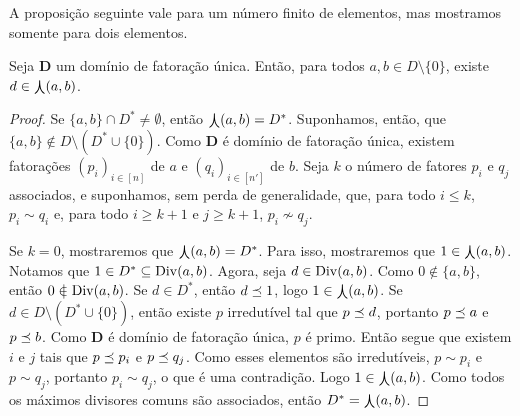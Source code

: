A proposição seguinte vale para um número finito de elementos, mas mostramos somente para dois elementos.

\begin{proposition}
Seja $\bm D$ um domínio de fatoração única. Então, para todos $a,b \in D \setminus \{0\}$, existe $d \in \mathop{\bigcurlywedge}(a,b)$.
\end{proposition}
\begin{proof}
Se $\{a,b\} \cap D^* \neq \emptyset$, então $\mathop{\bigcurlywedge}(a,b) = D^*$. Suponhamos, então, que $\{a,b\} \notin D \setminus (D^* \cup \{0\})$.
Como $\bm D$ é domínio de fatoração única, existem fatorações $(p_i)_{i \in [n]}$ de $a$ e $(q_i)_{i \in [n']}$ de $b$. Seja $k$ o número de fatores $p_i$ e $q_j$ associados, e suponhamos, sem perda de generalidade, que, para todo $i \leq k$, $p_i \sim q_i$ e, para todo $i \geq k+1$ e $j\geq k+1$, $p_i \not\sim q_j$.

Se $k=0$, mostraremos que $\mathop{\bigcurlywedge}(a,b) = D^*$. Para isso, mostraremos que $1 \in \mathop{\bigcurlywedge}(a,b)$. Notamos que $1 \in D^* \subseteq \operatorname{Div}(a,b)$. Agora, seja $d \in \operatorname{Div}(a,b)$. Como $0 \notin \{a,b\}$, então $0 \notin \divv(a,b)$. Se $d \in D^*$, então $d \preceq 1$, logo $1 \in \mathop{\bigcurlywedge}(a,b)$. Se $d \in D \setminus (D^* \cup \{0\})$, então existe $p$ irredutível tal que $p \preceq d$, portanto $p \preceq a$ e $p \preceq b$. Como $\bm D$ é domínio de fatoração única, $p$ é primo. Então segue que existem $i$ e $j$ tais que $p \preceq p_i$ e $p \preceq q_j$. Como esses elementos são irredutíveis, $p \sim p_i$ e $p \sim q_j$, portanto $p_i \sim q_j$, o que é uma contradição. Logo $1 \in \mathop{\bigcurlywedge}(a,b)$. Como todos os máximos divisores comuns são associados, então $D^* = \mathop{\bigcurlywedge}(a,b)$.


\end{proof}
